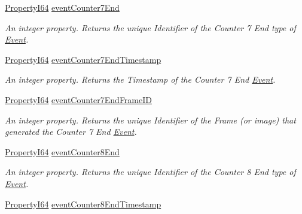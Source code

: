 \begin{DoxyCompactItemize}
\hyperlink{group___common_interface_ga81749b2696755513663492664a18a893}{Property\+I64} \hyperlink{classmv_i_m_p_a_c_t_1_1acquire_1_1_gen_i_cam_1_1_event_control_a0cf172f6094f0f66900be1a07ac8b7a8}{event\+Counter7\+End}
\begin{DoxyCompactList}\small\item\em An integer property. Returns the unique Identifier of the Counter 7 End type of \hyperlink{classmv_i_m_p_a_c_t_1_1acquire_1_1_event}{Event}. \end{DoxyCompactList}\item 
\hyperlink{group___common_interface_ga81749b2696755513663492664a18a893}{Property\+I64} \hyperlink{classmv_i_m_p_a_c_t_1_1acquire_1_1_gen_i_cam_1_1_event_control_a0d2893a55857e0a60086a5a4fa5dcd46}{event\+Counter7\+End\+Timestamp}
\begin{DoxyCompactList}\small\item\em An integer property. Returns the Timestamp of the Counter 7 End \hyperlink{classmv_i_m_p_a_c_t_1_1acquire_1_1_event}{Event}. \end{DoxyCompactList}\item 
\hyperlink{group___common_interface_ga81749b2696755513663492664a18a893}{Property\+I64} \hyperlink{classmv_i_m_p_a_c_t_1_1acquire_1_1_gen_i_cam_1_1_event_control_a7fd73295c65abfd53af8dd89a0ee4e47}{event\+Counter7\+End\+Frame\+I\+D}
\begin{DoxyCompactList}\small\item\em An integer property. Returns the unique Identifier of the Frame (or image) that generated the Counter 7 End \hyperlink{classmv_i_m_p_a_c_t_1_1acquire_1_1_event}{Event}. \end{DoxyCompactList}\item 
\hyperlink{group___common_interface_ga81749b2696755513663492664a18a893}{Property\+I64} \hyperlink{classmv_i_m_p_a_c_t_1_1acquire_1_1_gen_i_cam_1_1_event_control_ac6cf49e99ae7bed8b641f962b004b5ce}{event\+Counter8\+End}
\begin{DoxyCompactList}\small\item\em An integer property. Returns the unique Identifier of the Counter 8 End type of \hyperlink{classmv_i_m_p_a_c_t_1_1acquire_1_1_event}{Event}. \end{DoxyCompactList}\item 
\hyperlink{group___common_interface_ga81749b2696755513663492664a18a893}{Property\+I64} \hyperlink{classmv_i_m_p_a_c_t_1_1acquire_1_1_gen_i_cam_1_1_event_control_a42fa05f925298921b24c511d8259ec03}{event\+Counter8\+End\+Timestamp}

\end{DoxyCompactItemize}
